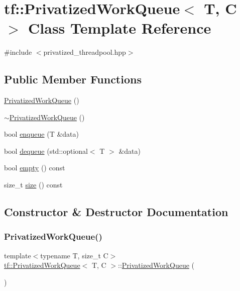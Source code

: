 \hypertarget{classtf_1_1PrivatizedWorkQueue}{}\section{tf\+:\+:Privatized\+Work\+Queue$<$ T, C $>$ Class Template Reference}
\label{classtf_1_1PrivatizedWorkQueue}


{\ttfamily \#include $<$privatized\+\_\+threadpool.\+hpp$>$}

\subsection*{Public Member Functions}
\begin{DoxyCompactItemize}
\item 
\hyperlink{classtf_1_1PrivatizedWorkQueue_a9d43e8b6ab30452b6541e55135999eba}{Privatized\+Work\+Queue} ()
\item 
\hyperlink{classtf_1_1PrivatizedWorkQueue_affae8d431b8ff82eff70a59567e0c817}{$\sim$\+Privatized\+Work\+Queue} ()
\item 
bool \hyperlink{classtf_1_1PrivatizedWorkQueue_aa0fc3d2e7d6747651140f61ebd4c079c}{enqueue} (T \&data)
\item 
bool \hyperlink{classtf_1_1PrivatizedWorkQueue_a3253fb50247e6ee6eb98c6338c135d61}{dequeue} (std\+::optional$<$ T $>$ \&data)
\item 
bool \hyperlink{classtf_1_1PrivatizedWorkQueue_a0c0b61c2c8dd2a6d068f7394c0d8dede}{empty} () const
\item 
size\+\_\+t \hyperlink{classtf_1_1PrivatizedWorkQueue_a2c4214bb253a5fdae5f1a727d1cd5156}{size} () const
\end{DoxyCompactItemize}


\subsection{Constructor \& Destructor Documentation}
\mbox{\label{classtf_1_1PrivatizedWorkQueue_a9d43e8b6ab30452b6541e55135999eba}} 
\subsubsection{\texorpdfstring{Privatized\+Work\+Queue()}{PrivatizedWorkQueue()}}
{\footnotesize\ttfamily template$<$typename T, size\+\_\+t C$>$ \\
\hyperlink{classtf_1_1PrivatizedWorkQueue}{tf\+::\+Privatized\+Work\+Queue}$<$ T, C $>$\+::\hyperlink{classtf_1_1PrivatizedWorkQueue}{Privatized\+Work\+Queue} (\begin{DoxyParamCaption}{ }\end{DoxyParamCaption})\hspace{0.3cm}{\ttfamily [inline]}}

